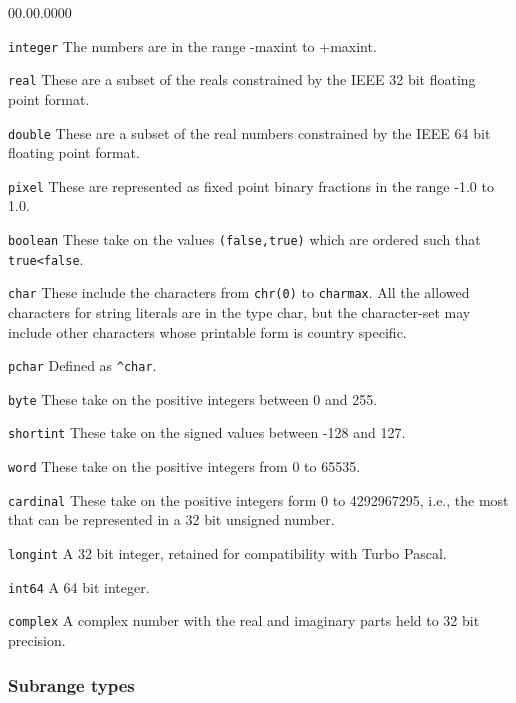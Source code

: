 \begin{lyxlist}{00.00.0000}
\item [\texttt{integer\index{integer}}]The numbers are in the range -maxint to +maxint.
\item [\texttt{real\index{real}}]These are a subset of the reals constrained by the
IEEE 32 bit floating point format.
\item [\texttt{double\index{double}}]These are a subset of the real numbers constrained
by the IEEE 64 bit floating point format.
\item [\texttt{pixel\index{pixel}}]These are represented as fixed point
binary fractions in the range -1.0 to 1.0.
\item [\texttt{boolean\index{boolean}}]These take on the values \texttt{(false,true)}
which are ordered such that \texttt{true<false}. 
\item [\texttt{char\index{char}}]These include the characters from \texttt{chr(0)}
to \texttt{charmax}. All the allowed characters for string literals
are in the type char, but the character-set may include other characters whose
printable form is country specific. 
\item [\texttt{pchar}\index{pchar}]Defined as \texttt{\textasciicircum{}char}.
\item [\texttt{byte\index{byte}}]These take on the positive integers between 0 and
255.
\item [\texttt{shortint\index{shortint}}]These take on the signed values between
-128 and 127.
\item [\texttt{word\index{word}}]These take on the positive integers from 0 to 65535.
\item [\texttt{cardinal\index{cardinal}}]These take on the positive integers form
0 to 4292967295, i.e., the most that can be represented in a 32 bit unsigned
number.
\item [\texttt{longint\index{longint}}]A 32 bit integer, retained for compatibility
with Turbo Pascal.
\item [\texttt{int\index{int64}64}]A 64 bit integer.
\item [\texttt{complex\index{complex}}]A complex number with the real and imaginary
parts held to 32 bit precision.
\end{lyxlist}

\subsubsection{Subrange types}


